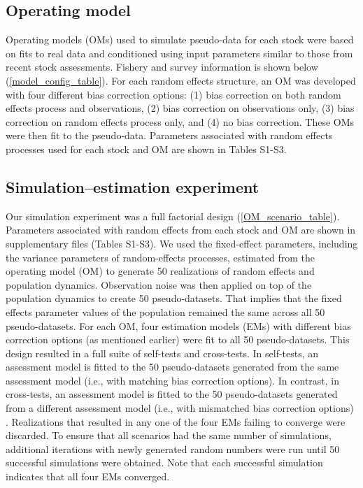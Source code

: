 \documentclass[
  12pt,
]{article}
\begin{document}
\subsection{Operating model}\label{operating-model}

Operating models (OMs) used to simulate pseudo-data for each stock were
based on fits to real data and conditioned using input parameters
similar to those from recent stock assessments. Fishery and survey
information is shown below (\autoref{model_config_table}). For each
random effects structure, an OM was developed with four different bias
correction options: (1) bias correction on both random effects process
and observations, (2) bias correction on observations only, (3) bias
correction on random effects process only, and (4) no bias correction.
These OMs were then fit to the pseudo-data. Parameters associated with
random effects processes used for each stock and OM are shown in Tables
S1-S3.

\subsection{Simulation--estimation
experiment}\label{simulationestimation-experiment}

Our simulation experiment was a full factorial design
(\autoref{OM_scenario_table}). Parameters associated with random effects
from each stock and OM are shown in supplementary files (Tables S1-S3).
We used the fixed-effect parameters, including the variance parameters
of random-effects processes, estimated from the operating model (OM) to
generate 50 realizations of random effects and population dynamics.
Observation noise was then applied on top of the population dynamics to
create 50 pseudo-datasets. That implies that the fixed effects parameter
values of the population remained the same across all 50
pseudo-datasets. For each OM, four estimation models (EMs) with
different bias correction options (as mentioned earlier) were fit to all
50 pseudo-datasets. This design resulted in a full suite of self-tests
and cross-tests. In self-tests, an assessment model is fitted to the 50
pseudo-datasets generated from the same assessment model (i.e., with
matching bias correction options). In contrast, in cross-tests, an
assessment model is fitted to the 50 pseudo-datasets generated from a
different assessment model (i.e., with mismatched bias correction
options) \citep{Deroba2015}. Realizations that resulted in any one of
the four EMs failing to converge were discarded. To ensure that all
scenarios had the same number of simulations, additional iterations with
newly generated random numbers were run until 50 successful simulations
were obtained. Note that each successful simulation indicates that all
four EMs converged.
\end{document}
